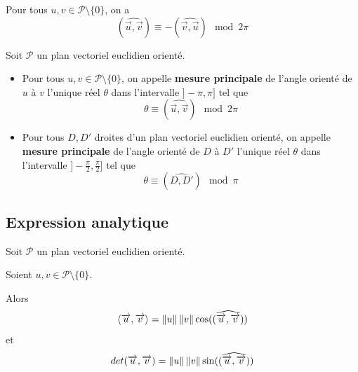 \documentclass[a4paper, 12pt]{article}
\begin{document}
\begin{corollaire}{}{}
    Pour tous $u, v \in \mathcal{P}\setminus\{0\}$, on a
    $$
    (\widehat{\overrightarrow{u}, \overrightarrow{v}}) \equiv -(\widehat{\overrightarrow{v}, \overrightarrow{u}}) \mod 2\pi
    $$
\end{corollaire}

\begin{definition}
    Soit $\mathcal{P}$ un plan vectoriel euclidien orienté.

    \begin{itemize}
        \item Pour tous $u, v \in \mathcal{P}\setminus\{0\}$, on appelle \textbf{mesure principale} de l'angle orienté de $u$ à $v$ l'unique réel $\theta$ dans l'intervalle $]-\pi, \pi]$ tel que $$\theta \equiv (\widehat{\overrightarrow{u}, \overrightarrow{v}}) \mod 2\pi$$
        \item Pour tous $D, D'$ droites d'un plan vectoriel euclidien orienté, on appelle \textbf{mesure principale} de l'angle orienté de $D$ à $D'$ l'unique réel $\theta$ dans l'intervalle $]-\frac{\pi}{2}, \frac{\pi}{2}]$ tel que $$\theta \equiv (\widehat{D, D'}) \mod \pi$$
    \end{itemize}
\end{definition}

\subsection{Expression analytique}

\begin{theoreme}{}{}
    Soit $\mathcal{P}$ un plan vectoriel euclidien orienté.

    Soient $u, v \in \mathcal{P}\setminus\{0\}$.

    Alors
    $$
    \langle\overrightarrow{u}, \overrightarrow{v}\rangle = \left\lVert u\right\rVert\left\lVert v\right\rVert\cos((\widehat{\overrightarrow{u}, \overrightarrow{v}}))
    $$
    et
    $$
    det(\overrightarrow{u}, \overrightarrow{v}) = \left\lVert u\right\rVert\left\lVert v\right\rVert\sin((\widehat{\overrightarrow{u}, \overrightarrow{v}}))
    $$
\end{theoreme}
\end{document}
